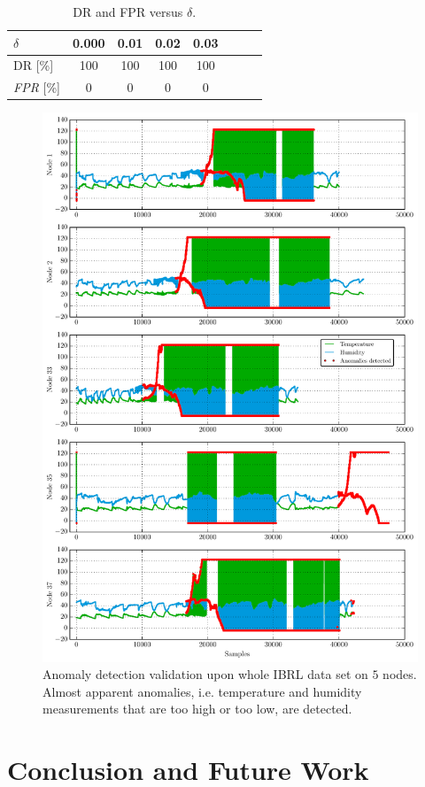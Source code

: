 \documentclass[conference]{IEEEtran}
\theoremstyle{problemstyle}
\begin{document}
\begin{table}[H]
\centering
\begin{tabular}{lccccccc}
\toprule
$\delta$ & 0.000 & 0.01 & 0.02 & 0.03 \\\midrule[\lightrulewidth]
DR [\%] & 100 & 100 & 100 & 100 \\
\emph{FPR} [\%] & 0 & 0 & 0 & 0 \\\bottomrule
\end{tabular}
\caption{DR and FPR versus $\delta$.}
\label{table:delta_eval}
\end{table}

\begin{figure}
\centering
\includegraphics[scale=.7]{Python/time_validation.pdf}
\caption{Anomaly detection validation upon whole IBRL data set on $5$ nodes. Almost apparent anomalies, i.e. temperature and humidity measurements that are too high or too low, are detected.}
\label{fig:time_valid}
\end{figure}

\section{Conclusion and Future Work}



\end{document}
